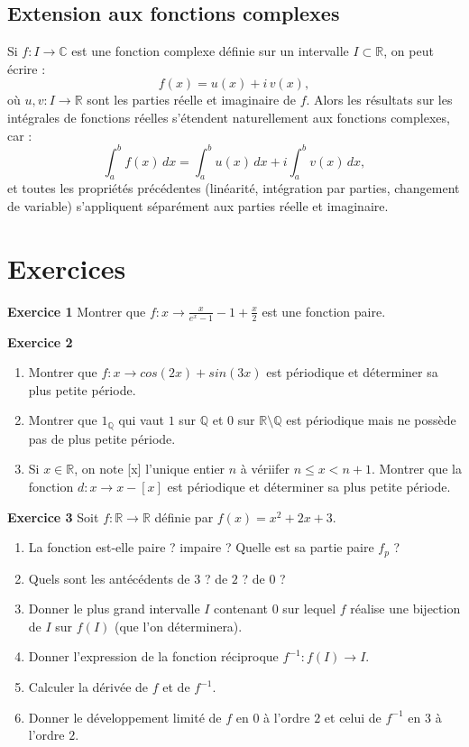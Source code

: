 \documentclass{report} %
\theoremstyle{definition}  %
\theoremstyle{plain} %
\theoremstyle{remark} %
\begin{document}
\section{\textbf{Extension aux fonctions complexes}}

Si \(f : I \to \mathbb{C}\) est une fonction complexe définie sur un intervalle \(I \subset \mathbb{R}\), on peut écrire :
\[
f(x) = u(x) + i\, v(x),
\]
où \(u,v : I \to \mathbb{R}\) sont les parties réelle et imaginaire de \(f\).  
Alors les résultats sur les intégrales de fonctions réelles s'étendent naturellement aux fonctions complexes, car :
\[
\int_a^b f(x)\, dx = \int_a^b u(x)\, dx + i \int_a^b v(x)\, dx,
\]
et toutes les propriétés précédentes (linéarité, intégration par parties, changement de variable) s'appliquent séparément aux parties réelle et imaginaire.

\chapter{\textbf{Exercices}}

\textbf{Exercice 1} 
Montrer que \(f:x \to \frac{x}{e^x - 1} - 1 + \frac{x}{2} \) est une fonction paire.
\medskip

\noindent
\textbf{Exercice 2}
\begin{enumerate}
\item Montrer que \(f: x \to cos(2x) + sin(3x)\) est périodique et déterminer sa plus petite période.
\item Montrer que \(1_\mathbb{Q}\) qui vaut \(1\) sur \(\mathbb{Q}\) et \(0\) sur \(\mathbb{R} \setminus \mathbb{Q}\) est périodique mais ne possède pas de plus petite période.
\item Si \(x \in \mathbb{R}\), on note [x] l'unique entier \(n\) à vériifer \(n \leq x < n+1\). Montrer que la fonction \(d:x \to x - [x]\) est périodique et déterminer sa plus petite période.
\end{enumerate}
\medskip

\noindent
\textbf{Exercice 3} 
Soit \(f: \mathbb{R} \to \mathbb{R}\) définie par \(f(x) = x^2 + 2x + 3\).
\begin{enumerate}
\item La fonction est-elle paire ? impaire ? Quelle est sa partie paire \(f_p\) ?
\item Quels sont les antécédents de \(3\) ? de \(2\) ? de \(0\) ?
\item Donner le plus grand intervalle \(I\) contenant \(0\) sur lequel \(f\) réalise une bijection de \(I\) sur \(f(I)\) (que l'on déterminera).
\item Donner l'expression de la fonction réciproque \(f^{-1}: f(I) \to I\).
\item Calculer la dérivée de \(f\) et de \(f^{-1}\).
\item Donner le développement limité de \(f\) en \(0\) à l'ordre \(2\) et celui de \(f^{-1}\) en \(3\) à l'ordre \(2\).
\end{enumerate}
\medskip
\end{document}
